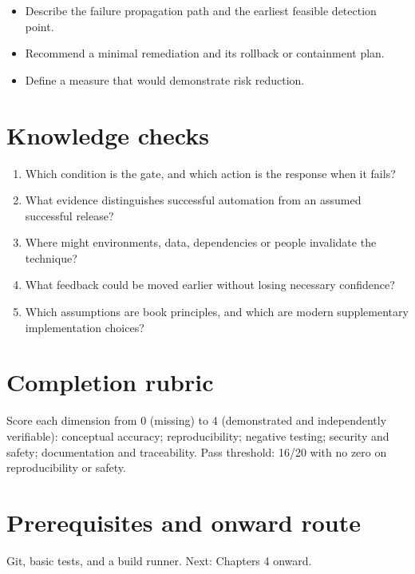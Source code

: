 \documentclass[10pt,letterpaper]{article}
\begin{document}
\begin{itemize}
\item Describe the failure propagation path and the earliest feasible detection point.
\item Recommend a minimal remediation and its rollback or containment plan.
\item Define a measure that would demonstrate risk reduction.
\end{itemize}

\section{Knowledge checks}
\begin{enumerate}
\item Which condition is the gate, and which action is the response when it fails?
\item What evidence distinguishes successful automation from an assumed successful release?
\item Where might environments, data, dependencies or people invalidate the technique?
\item What feedback could be moved earlier without losing necessary confidence?
\item Which assumptions are book principles, and which are modern supplementary implementation choices?
\end{enumerate}

\section{Completion rubric}
Score each dimension from 0 (missing) to 4 (demonstrated and independently verifiable): conceptual accuracy; reproducibility; negative testing; security and safety; documentation and traceability. Pass threshold: 16/20 with no zero on reproducibility or safety.


\section{Prerequisites and onward route}
Git, basic tests, and a build runner. Next: Chapters 4 onward.
\end{document}
